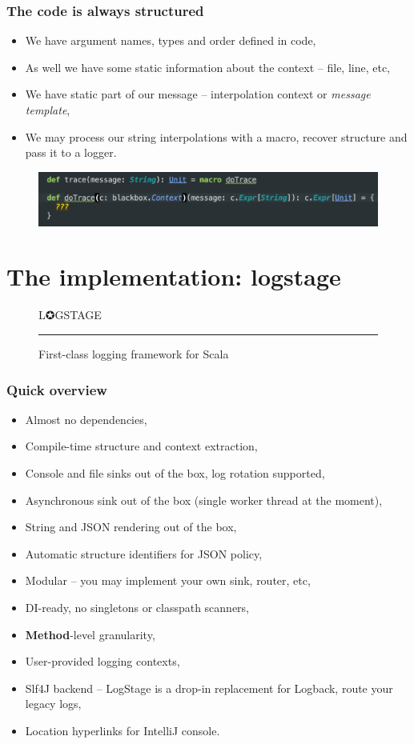 \documentclass[usenames,dvipsnames]{beamer}
\begin{document}
\begin{frame}
\frametitle{The code is always structured}
\begin{itemize}
\item We have argument names, types and order defined in code,
\item As well we have some static information about the context -- file, line, etc,
\item We have static part of our message -- interpolation context or \textit{message template},
\item We may process our string interpolations with a macro, recover structure and pass it to a logger.
\end{itemize}
\begin{figure}
    \includegraphics[width=\textwidth]{media/macro-snippet.png}
\end{figure}
\end{frame}

\section{The implementation: logstage}

\begin{frame}
\begin{figure}
\Huge
\color{RubineRed} L✪GSTAGE
\noindent
{\color{RubineRed} \rule{\linewidth}{1mm} }
\Large First-class logging framework for Scala
\end{figure}
\end{frame}

\begin{frame}
\frametitle{Quick overview}
\begin{itemize}
\item Almost no dependencies,
\item Compile-time structure and context extraction,
\item Console and file sinks out of the box, log rotation supported,
\item Asynchronous sink out of the box (single worker thread at the moment),
\item String and JSON rendering out of the box,
\item Automatic structure identifiers for JSON policy,
\item Modular -- you may implement your own sink, router, etc,
\item DI-ready, no singletons or classpath scanners,
\item \textbf{Method}-level granularity,
\item User-provided logging contexts,
\item Slf4J backend -- LogStage is a drop-in replacement for Logback, route your legacy logs,
\item Location hyperlinks for IntelliJ console.
\end{itemize}
\end{frame}
\end{document}
